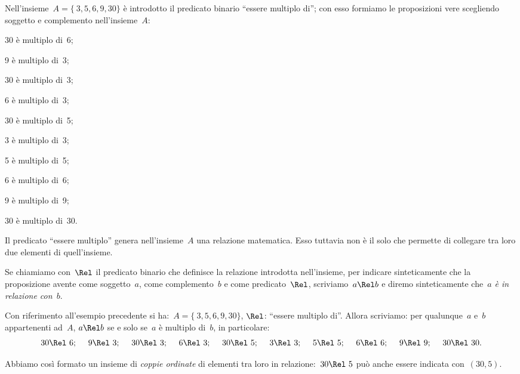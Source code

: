 \begin{exrig}
 \begin{esempio}
 Nell'insieme~$A = \lbrace~3, 5, 6, 9, 30 \rbrace$ è introdotto il predicato 
binario ``essere multiplo di''; con esso formiamo le proposizioni vere 
scegliendo soggetto e
 complemento nell'insieme~$A$:

\begin{multicols}{3}
30 è multiplo di~6;

9 è multiplo di~3;

30 è multiplo di~3;

6 è multiplo di~3;

30 è multiplo di~5;

3 è multiplo di~3;

5 è multiplo di~5;

6 è multiplo di~6;

9 è multiplo di~9;

30 è multiplo di~30.
\end{multicols}
Il predicato ``essere multiplo'' genera nell'insieme~$A$ una relazione 
matematica. Esso tuttavia non è il
solo che permette di collegare tra loro due elementi di quell'insieme.
\end{esempio}
\end{exrig}


Se chiamiamo con~$\Rel$ il predicato binario che definisce la relazione 
introdotta nell'insieme, per indicare sinteticamente
che la proposizione avente come soggetto~$a$, come complemento~$b$ e come 
predicato~$\Rel$, scriviamo~$a \Rel b$ e
diremo sinteticamente che~\emph{$a$ è in relazione con~$b$}.

\begin{exrig}
 \begin{esempio}

Con riferimento all'esempio precedente si ha:~$A = \lbrace~3,5,6,9,30 \rbrace$, 
$\Rel$:
``essere multiplo di''. Allora scriviamo: per qualunque~$a$ e~$b$ appartenenti 
ad~$A$,
$a \Rel b$ se e solo se~$a$ è multiplo di~$b$, in particolare:
\[30 \Rel~6;\quad~9 \Rel~3;\quad~30 \Rel~3;\quad~6 \Rel~3;\quad~30 
\Rel~5;\quad~3 \Rel~3;\quad~5 \Rel~5;\quad~6 \Rel~6;\quad~9 \Rel~9;\quad~30 
\Rel~30.\]
\end{esempio}
\end{exrig}

Abbiamo così formato un insieme di \emph{coppie ordinate} di elementi tra loro 
in relazione:~$30 \Rel~5$ può anche essere indicata con~$(30,5)$.

